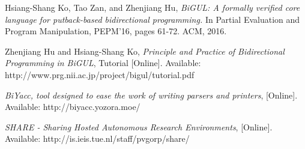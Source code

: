 \begin{thebibliography}{1}
     Hsiang-Shang Ko, Tao Zan, and Zhenjiang Hu, {\em BiGUL: A formally verified core language for putback-based bidirectional programming.} In Partial Evaluation and Program Manipulation, PEPM'16, pages 61-72. ACM, 2016.
    
     Zhenjiang Hu and Hsiang-Shang Ko,  {\em Principle and Practice of Bidirectional Programming in BiGUL}, Tutorial [Online]. Available: http://www.prg.nii.ac.jp/project/bigul/tutorial.pdf
    
     {\em BiYacc, tool designed to ease the work of writing parsers and printers}, [Online]. Available: http://biyacc.yozora.moe/
    
     {\em SHARE - Sharing Hosted Autonomous Research Environments}, [Online]. Available: http://is.ieis.tue.nl/staff/pvgorp/share/
    
		
\end{thebibliography}

